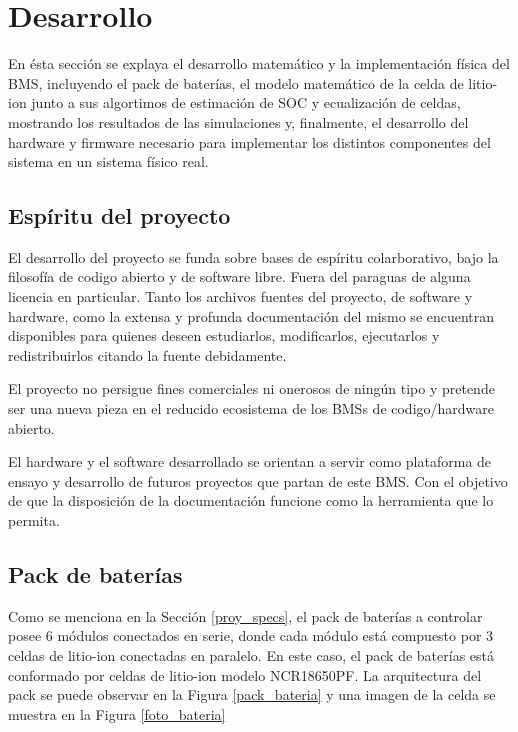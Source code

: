 \documentclass[10pt, a4paper]{report}
\begin{document}
\thispagestyle{fancy}



\chapter{Desarrollo}\label{desarrollo}
\thispagestyle{fancy}

En \'esta secci\'on se explaya el desarrollo matem\'atico y la implementaci\'on 
f\'isica del \acrshort{BMS}, incluyendo el pack de bater\'ias, el modelo 
matem\'atico de la celda de litio-ion junto a sus algortimos de estimaci\'on de 
\acrshort{SOC} y ecualizaci\'on de celdas, mostrando los resultados de las
simulaciones y, finalmente, el desarrollo del hardware y firmware necesario para
implementar los distintos componentes del sistema en un sistema f\'isico real.

\section{Espíritu del proyecto}

El desarrollo del proyecto se funda sobre bases de espíritu colarborativo, bajo
la filosofía de codigo abierto y de software libre. Fuera del paraguas de alguna
licencia en particular. Tanto los archivos fuentes del proyecto, de software y
hardware, como la extensa y profunda documentación del mismo se encuentran
disponibles para quienes deseen estudiarlos, modificarlos, ejecutarlos y
redistribuirlos citando la fuente debidamente. 

El proyecto no persigue fines comerciales ni onerosos de ningún tipo y pretende
ser una nueva pieza en el reducido ecosistema de los \acrshort{BMS}s de
codigo/hardware abierto.

El hardware y el software desarrollado se orientan a servir como plataforma de
ensayo y desarrollo de futuros proyectos que partan de este \acrshort{BMS}. Con
el objetivo de que la disposición de la documentación funcione como la
herramienta que lo permita.

\section{Pack de bater\'ias}\label{battery_pack}

Como se menciona en la Secci\'on \ref{proy_specs}, el pack de bater\'ias a
controlar posee 6 m\'odulos conectados en serie, donde cada m\'odulo est\'a
compuesto por 3 celdas de litio-ion conectadas en paralelo. En este caso, el pack
de bater\'ias est\'a conformado por celdas de litio-ion modelo NCR18650PF. La
arquitectura del pack se puede observar en la Figura \ref{pack_bateria} y una
imagen de la celda se muestra en la Figura \ref{foto_bateria}
\end{document}
